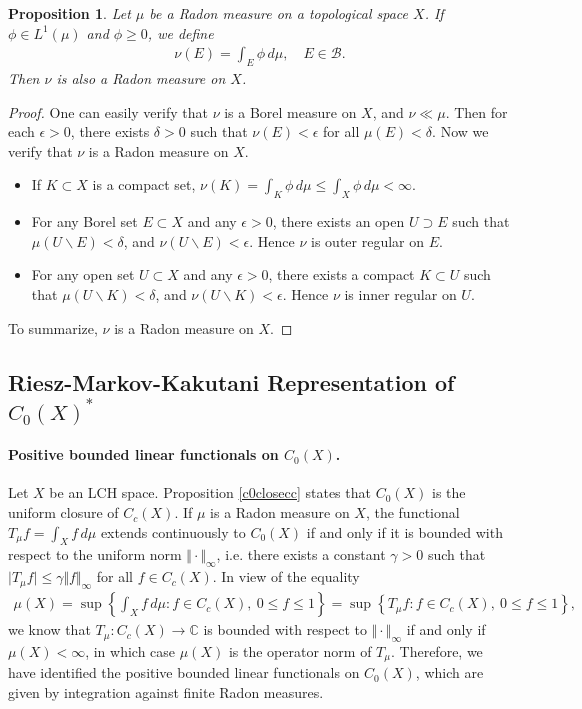 \documentclass{article}
\numberwithin{equation}{section}
\newcommand{\bbC}{\mathbb{C}}
\theoremstyle{plain}
\newtheorem{proposition}[theorem]{Proposition}
\theoremstyle{definition}
\begin{document}
\begin{proposition}\label{l1induceradon}
	Let $\mu$ be a Radon measure on a topological space $X$. If $\phi\in L^1(\mu)$ and $\phi\geq 0$, we define
	\begin{align*}
		\nu(E)=\int_E\phi\,d\mu,\quad E\in\mathscr{B}.
	\end{align*}
	Then $\nu$ is also a Radon measure on $X$.
\end{proposition}
\begin{proof}
	One can easily verify that $\nu$ is a Borel measure on $X$, and $\nu\ll\mu$. Then for each $\epsilon>0$, there exists $\delta>0$ such that $\nu(E)<\epsilon$ for all $\mu(E)<\delta$. Now we verify that $\nu$ is a Radon measure on $X$.
	\begin{itemize}
		\item If $K\subset X$ is a compact set, $\nu(K)=\int_K\phi\,d\mu\leq\int_X\phi\,d\mu<\infty$. 
		\item For any Borel set $E\subset X$ and any $\epsilon>0$, there exists an open $U\supset E$ such that $\mu(U\backslash E)<\delta$, and $\nu(U\backslash E)<\epsilon$. Hence $\nu$ is outer regular on $E$.
		\item For any open set $U\subset X$ and any $\epsilon>0$, there exists a compact $K\subset U$ such that $\mu(U\backslash K)<\delta$, and $\nu(U\backslash K)<\epsilon$. Hence $\nu$ is inner regular on $U$.
	\end{itemize}
	To summarize, $\nu$ is a Radon measure on $X$.
\end{proof}

\newpage
\subsection{Riesz-Markov-Kakutani Representation of $C_0(X)^*$}
\paragraph{Positive bounded linear functionals on $C_0(X)$.} Let $X$ be an LCH space. Proposition \ref{c0closecc} states that $C_0(X)$ is the uniform closure of $C_c(X)$. If $\mu$ is a Radon measure on $X$, the functional $T_\mu f=\int_X f\,d\mu$ extends continuously to $C_0(X)$ if and only if it is bounded with respect to the uniform norm $\Vert\cdot\Vert_\infty$, i.e. there exists a constant $\gamma>0$ such that $\vert T_\mu f\vert\leq\gamma\Vert f\Vert_\infty$ for all $f\in C_c(X)$. In view of the equality
\begin{align*}
	\mu(X)=\sup\left\{\int_X f\,d\mu:f\in C_c(X),\ 0\leq f\leq 1\right\}=\sup\left\{T_\mu f:f\in C_c(X),\ 0\leq f\leq 1\right\},
\end{align*}
we know that $T_\mu:C_c(X)\to\bbC$ is bounded with respect to $\Vert\cdot\Vert_\infty$ if and only if $\mu(X)<\infty$, in which case $\mu(X)$ is the operator norm of $T_\mu$. Therefore, we have identified the positive bounded linear functionals on $C_0(X)$, which are given by integration against finite Radon measures.
\end{document}
